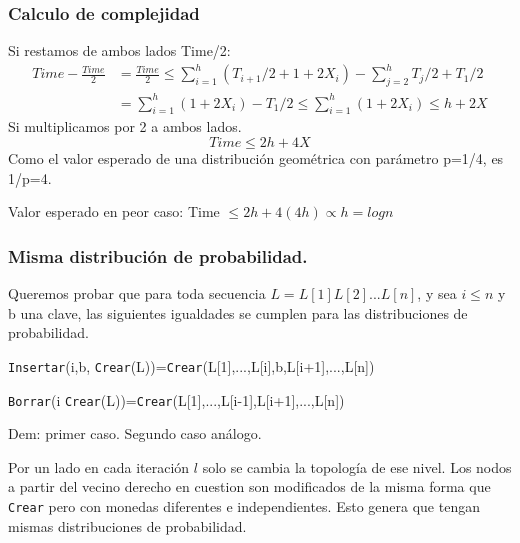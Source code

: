 \documentclass[10pt]{beamer}
\begin{document}
\begin{frame}
\frametitle{Calculo de complejidad}
Si restamos de ambos lados Time/2:
\begin{equation*}
  \begin{split}
    Time - \frac{Time}{2} &= \frac{Time}{2} \leq \sum_{i=1}^h (T_{i+1}/2 +1 + 2X_i) -  \sum_{j=2}^h T_j/2 + T_1/2 \\
                          &= \sum_{i=1}^h (1 + 2X_i) - T_1/2 \leq  \sum_{i=1}^h (1 + 2X_i) \leq h + 2X
  \end{split}
\end{equation*}
Si multiplicamos por 2 a ambos lados.
\pause
\begin{equation*}
  Time \leq 2h + 4X
\end{equation*}
\pause
Como el valor esperado de una distribución geométrica con parámetro p=1/4, es 1/p=4.
\pause
\begin{mdframed}[backgroundcolor=frenchblue!20]
  Valor esperado en peor caso: Time $\leq 2h+4(4h) \propto h=logn$
\end{mdframed}

\end{frame}



\begin{frame}
\frametitle{Misma distribución de probabilidad.}

Queremos probar que para toda secuencia $L=L[1]L[2]...L[n]$, y sea $i\leq n$ y b una clave,
las siguientes igualdades se cumplen para las distribuciones de probabilidad.

\pause
\begin{centering}
  \texttt{Insertar}(i,b, \texttt{Crear}(L))=\texttt{Crear}(L[1],...,L[i],b,L[i+1],...,L[n])
\end{centering}

\begin{centering}
  \texttt{Borrar}(i \texttt{Crear}(L))=\texttt{Crear}(L[1],...,L[i-1],L[i+1],...,L[n])
\end{centering}

\pause
Dem: primer caso. Segundo caso análogo.

\pause
Por un lado en cada iteración $l$ solo se cambia la topología de ese nivel.
Los nodos a partir del vecino derecho en cuestion son modificados de la misma forma que \texttt{Crear} pero con
monedas diferentes e independientes.
Esto genera que tengan mismas distribuciones de probabilidad.

\end{frame}
\end{document}
